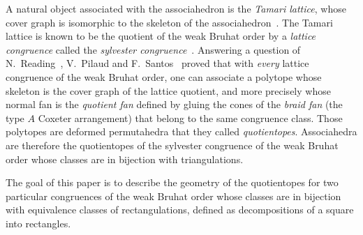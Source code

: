 \documentclass{amsart}
\theoremstyle{definition}
\newcommand{\darkblue}{\color{darkblue}} %
\newcommand{\defn}[1]{\textsl{\darkblue #1}} %
\begin{document}
A natural object associated with the associahedron is the \defn{Tamari lattice}, whose cover graph is isomorphic to the skeleton of the associahedron~\cite{MR0146227,MR3235205}.
The Tamari lattice is known to be the quotient of the weak Bruhat order by a \defn{lattice congruence} called the \defn{sylvester congruence}~\cite{MR1654173,MR2142078}.
Answering a question of N.~Reading~\cite{MR2142177}, V.~Pilaud and F.~Santos~\cite{MR3964495} proved that with \emph{every} lattice congruence of the weak Bruhat order, one can associate a polytope whose skeleton is the cover graph of the lattice quotient, and more precisely whose normal fan is the \defn{quotient fan} defined by gluing the cones of the \defn{braid fan} (the type $A$ Coxeter arrangement) that belong to the same congruence class.
Those polytopes are deformed permutahedra that they called \defn{quotientopes}.
Associahedra are therefore the quotientopes of the sylvester congruence of the weak Bruhat order whose classes are in bijection with triangulations.

The goal of this paper is to describe the geometry of the quotientopes for two particular congruences of the weak Bruhat order whose classes are in bijection with equivalence classes of rectangulations, defined as decompositions of a square into rectangles.
\end{document}
